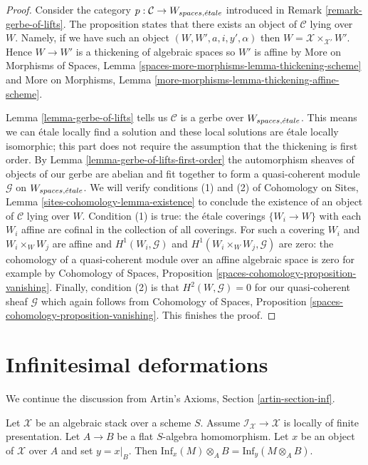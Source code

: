 \begin{proof}
Consider the category $p : \mathcal{C} \to W_{spaces, {\acute{e}tale}}$
introduced in Remark \ref{remark-gerbe-of-lifts}.
The proposition states that there exists an object of $\mathcal{C}$
lying over $W$. Namely, if we have such an object
$(W, W', a, i, y', \alpha)$ then $W = \mathcal{X} \times_{\mathcal{X}'} W'$.
Hence $W \to W'$ is a thickening of algebraic spaces so
$W'$ is affine by
More on Morphisms of Spaces, Lemma
\ref{spaces-more-morphisms-lemma-thickening-scheme}
and More on Morphisms, Lemma
\ref{more-morphisms-lemma-thickening-affine-scheme}.

\medskip\noindent
Lemma \ref{lemma-gerbe-of-lifts} tells us $\mathcal{C}$ is a gerbe over
$W_{spaces, {\acute{e}tale}}$. This means we can \'etale locally find a solution and
these local solutions are \'etale locally isomorphic;
this part does not require the assumption that the thickening is first order.
By Lemma \ref{lemma-gerbe-of-lifts-first-order}
the automorphism sheaves of objects of our gerbe are abelian and
fit together to form a quasi-coherent module $\mathcal{G}$
on $W_{spaces, {\acute{e}tale}}$. We will verify conditions (1) and (2)
of Cohomology on Sites, Lemma \ref{sites-cohomology-lemma-existence}
to conclude the existence of an object of $\mathcal{C}$ lying over $W$.
Condition (1) is true: the \'etale coverings $\{W_i \to W\}$
with each $W_i$ affine are cofinal in the collection of all coverings.
For such a covering $W_i$ and $W_i \times_W W_j$ are affine
and $H^1(W_i, \mathcal{G})$ and $H^1(W_i \times_W W_j, \mathcal{G})$
are zero: the cohomology of a quasi-coherent module over an affine
algebraic space is zero for example by Cohomology of Spaces, Proposition
\ref{spaces-cohomology-proposition-vanishing}.
Finally, condition (2) is that $H^2(W, \mathcal{G}) = 0$
for our quasi-coherent sheaf $\mathcal{G}$ which again follows
from Cohomology of Spaces, Proposition
\ref{spaces-cohomology-proposition-vanishing}.
This finishes the proof.
\end{proof}






\section{Infinitesimal deformations}
\label{section-inf}

\noindent
We continue the discussion from
Artin's Axioms, Section \ref{artin-section-inf}.

\begin{lemma}
\label{lemma-inf-quasi-coherent}
Let $\mathcal{X}$ be an algebraic stack over a scheme $S$.
Assume $\mathcal{I}_\mathcal{X} \to \mathcal{X}$ is locally
of finite presentation. Let $A \to B$ be a flat $S$-algebra homomorphism.
Let $x$ be an object of $\mathcal{X}$ over $A$ and set $y = x|_B$.
Then $\text{Inf}_x(M) \otimes_A B = \text{Inf}_y(M \otimes_A B)$.
\end{lemma}

